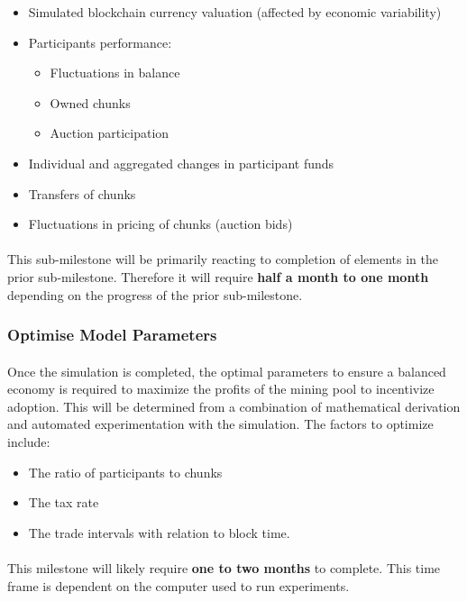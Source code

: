 \begin{itemize}
  \item Simulated blockchain currency valuation (affected by economic variability)
  \item Participants performance:
    \begin{itemize}
      \item Fluctuations in balance
      \item Owned chunks
      \item Auction participation
    \end{itemize}
  \item Individual and aggregated changes in participant funds
  \item Transfers of chunks
  \item Fluctuations in pricing of chunks (auction bids)
\end{itemize}

\paragraph{} This sub-milestone will be primarily reacting to completion of elements in the prior sub-milestone. Therefore it will require \textbf{half a month to one month} depending on the progress of the prior sub-milestone.

\subsubsection{Optimise Model Parameters}

\paragraph{} Once the simulation is completed, the optimal parameters to ensure a balanced economy is required to maximize the profits of the mining pool to incentivize adoption. This will be determined from a combination of mathematical derivation and automated experimentation with the simulation. The factors to optimize include: 

\begin{itemize}
  \item The ratio of participants to chunks
  \item The tax rate
  \item The trade intervals with relation to block time.
\end{itemize}

\paragraph{} This milestone will likely require \textbf{one to two months} to complete. This time frame is dependent on the computer used to run experiments.

